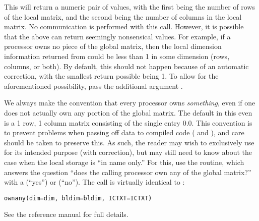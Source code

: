 This will return a numeric pair of values, with the first being the number of rows of the local matrix, and the second being the number of columns in the local matrix.  No communication is performed with this call.  However, it is possible that the above can return seemingly nonsensical values.  For example, if a processor owns no piece of the global matrix, then the local dimension information returned from  could be less than 1 in some dimension (rows, columns, or both).  By default, this should not happen because of an automatic correction, with the smallest return possible being 1.  To allow for the aforementioned possibility, pass the additional argument .

We always make the convention that every processor owns \emph{something}, even if one does not actually own any portion of the global matrix.  The default in this even is a 1 row, 1 column matrix consisting of the single entry $0.0$.  This convention is to prevent problems when passing off data to compiled code ( and ), and care should be taken to preserve this.  As such, the reader may wish to exclusively use  for its intended purpose (with correction), but may still need to know about the case when the local storage is ``in name only.''  For this, use the  routine, which answers the question ``does the calling processor own any of the global matrix?'' with a  (``yes'') or  (``no'').  The call is virtually identical to :

\begin{lstlisting}[language=rr]
ownany(dim=dim, bldim=bldim, ICTXT=ICTXT)
\end{lstlisting}

See the  reference manual for full details.
